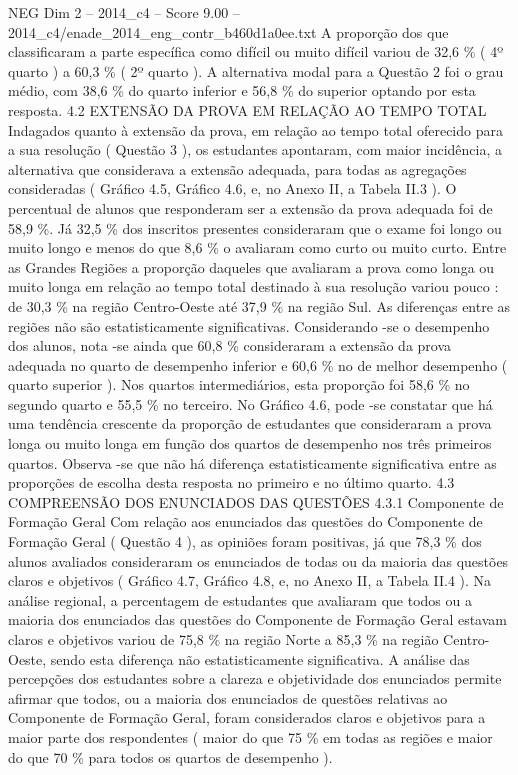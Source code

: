 \begin{textsample}{NEG Dim 2 – 2014\_c4 – Score 9.00 – 2014\_c4/enade\_2014\_eng\_contr\_b460d1a0ee.txt}
A proporção dos que classificaram a parte específica como difícil ou muito difícil variou de 32,6 \% ( 4º quarto ) a 60,3 \% ( 2º quarto ).
A alternativa modal para a Questão 2 foi o grau médio, com 38,6 \% do quarto inferior e 56,8 \% do superior optando por esta resposta. 4.2 EXTENSÃO DA PROVA EM RELAÇÃO AO TEMPO TOTAL Indagados quanto à extensão da prova, em relação ao tempo total oferecido para a sua resolução ( Questão 3 ), os estudantes apontaram, com maior incidência, a alternativa que considerava a extensão adequada, para todas as agregações consideradas ( Gráfico 4.5, Gráfico 4.6, e, no Anexo II, a Tabela II.3 ).
O percentual de alunos que responderam ser a extensão da prova adequada foi de 58,9 \%.
Já 32,5 \% dos inscritos presentes consideraram que o exame foi longo ou muito longo e menos do que 8,6 \% o avaliaram como curto ou muito curto.
Entre as Grandes Regiões a proporção daqueles que avaliaram a prova como longa ou muito longa em relação ao tempo total destinado à sua resolução variou pouco : de 30,3 \% na região Centro-Oeste até 37,9 \% na região Sul.
As diferenças entre as regiões não são estatisticamente significativas.
Considerando -se o desempenho dos alunos, nota -se ainda que 60,8 \% consideraram a extensão da prova adequada no quarto de desempenho inferior e 60,6 \% no de melhor desempenho ( quarto superior ).
Nos quartos intermediários, esta proporção foi 58,6 \% no segundo quarto e 55,5 \% no terceiro.
No Gráfico 4.6, pode -se constatar que há uma tendência crescente da proporção de estudantes que consideraram a prova longa ou muito longa em função dos quartos de desempenho nos três primeiros quartos.
Observa -se que não há diferença estatisticamente significativa entre as proporções de escolha desta resposta no primeiro e no último quarto. 4.3 COMPREENSÃO DOS ENUNCIADOS DAS QUESTÕES 4.3.1 Componente de Formação Geral Com relação aos enunciados das questões do Componente de Formação Geral ( Questão 4 ), as opiniões foram positivas, já que 78,3 \% dos alunos avaliados consideraram os enunciados de todas ou da maioria das questões claros e objetivos ( Gráfico 4.7, Gráfico 4.8, e, no Anexo II, a Tabela II.4 ).
Na análise regional, a percentagem de estudantes que avaliaram que todos ou a maioria dos enunciados das questões do Componente de Formação Geral estavam claros e objetivos variou de 75,8 \% na região Norte a 85,3 \% na região Centro-Oeste, sendo esta diferença não estatisticamente significativa.
A análise das percepções dos estudantes sobre a clareza e objetividade dos enunciados permite afirmar que todos, ou a maioria dos enunciados de questões relativas ao Componente de Formação Geral, foram considerados claros e objetivos para a maior parte dos respondentes ( maior do que 75 \% em todas as regiões e maior do que 70 \% para todos os quartos de desempenho ).

\end{textsample}
